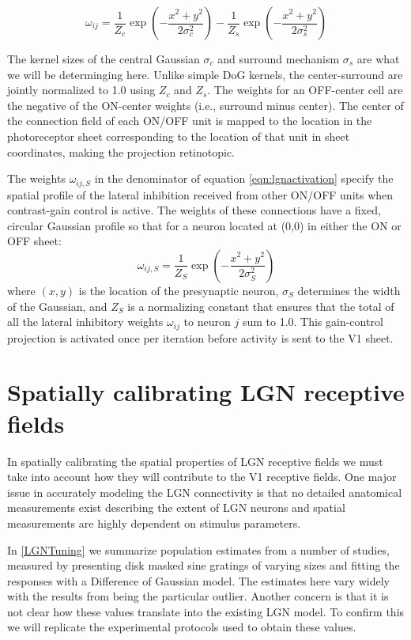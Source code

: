 \begin{equation}
\omega_{ij}=\frac{1}{Z_c}\exp{\left(-\frac{x^{2}+y^{2}}{2\sigma_{c}^{2}}\right)}-\frac{1}{Z_s}\exp\left(-\frac{x^{2}+y^{2}}{2\sigma_{s}^{2}}\right)
\label{eqn:DoG}
\end{equation}

The kernel sizes of the central Gaussian $\sigma_{c}$ and surround
mechanism $\sigma_{s}$ are what we will be determinging here. Unlike
simple DoG kernels, the center-surround are jointly normalized to 1.0
using $Z_c$ and $Z_s$. The weights for an OFF-center cell are the
negative of the ON-center weights (i.e., surround minus center). The
center of the connection field of each ON/OFF unit is mapped to the
location in the photoreceptor sheet corresponding to the location of
that unit in sheet coordinates, making the projection retinotopic.

The weights $\omega_{ij, S}$ in the denominator of equation
\ref{eqn:lgnactivation} specify the spatial profile of the lateral
inhibition received from other ON/OFF units when contrast-gain control
is active. The weights of these connections have a fixed, circular
Gaussian profile so that for a neuron located at (0,0) in either the
ON or OFF sheet:
\begin{equation}
\omega_{ij,S}=\frac{1}{Z_S}\exp\left(-\frac{x^{2}+y^{2}}{2\sigma_{S}^{2}}\right)
\label{eqn:gauss}
\end{equation}
where $(x, y)$ is the location of the presynaptic neuron, $\sigma_{S}$
determines the width of the Gaussian, and $Z_S$ is a normalizing
constant that ensures that the total of all the lateral inhibitory
weights $\omega_{ij}$ to neuron $j$ sum to 1.0. This gain-control
projection is activated once per iteration before activity is sent to
the V1 sheet.

\section{Spatially calibrating LGN receptive fields}

In spatially calibrating the spatial properties of LGN receptive
fields we must take into account how they will contribute to the V1
receptive fields. One major issue in accurately modeling the LGN
connectivity is that no detailed anatomical measurements exist
describing the extent of LGN neurons and spatial measurements are
highly dependent on stimulus parameters. 

In \ref{LGNTuning} we summarize population estimates from a number of
studies, measured by presenting disk masked sine gratings of varying
sizes and fitting the responses with a Difference of Gaussian model.
The estimates here vary widely with the results from
\citep{Sceniak2006} being the particular outlier. Another concern is
that it is not clear how these values translate into the existing LGN
model. To confirm this we will replicate the experimental protocols
used to obtain these values.

